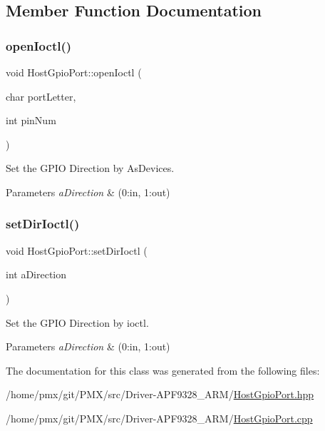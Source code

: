 \subsection{Member Function Documentation}
\mbox{\label{classHostGpioPort_a470f2d24f0f75d05fdc769db97af7a5b}} 
\subsubsection{\texorpdfstring{open\+Ioctl()}{openIoctl()}}
{\footnotesize\ttfamily void Host\+Gpio\+Port\+::open\+Ioctl (\begin{DoxyParamCaption}\item[{char}]{port\+Letter,  }\item[{int}]{pin\+Num }\end{DoxyParamCaption})}



Set the G\+P\+IO Direction by As\+Devices. 


\begin{DoxyParams}{Parameters}
{\em a\+Direction} & (0\+:in, 1\+:out) \\
\hline
\end{DoxyParams}
\mbox{\label{classHostGpioPort_a0c7cf6d4131e5aa2bfa88c85c169f856}} 
\subsubsection{\texorpdfstring{set\+Dir\+Ioctl()}{setDirIoctl()}}
{\footnotesize\ttfamily void Host\+Gpio\+Port\+::set\+Dir\+Ioctl (\begin{DoxyParamCaption}\item[{int}]{a\+Direction }\end{DoxyParamCaption})}



Set the G\+P\+IO Direction by ioctl. 


\begin{DoxyParams}{Parameters}
{\em a\+Direction} & (0\+:in, 1\+:out) \\
\hline
\end{DoxyParams}


The documentation for this class was generated from the following files\+:\begin{DoxyCompactItemize}
\item 
/home/pmx/git/\+P\+M\+X/src/\+Driver-\/\+A\+P\+F9328\+\_\+\+A\+R\+M/\hyperlink{HostGpioPort_8hpp}{Host\+Gpio\+Port.\+hpp}\item 
/home/pmx/git/\+P\+M\+X/src/\+Driver-\/\+A\+P\+F9328\+\_\+\+A\+R\+M/\hyperlink{HostGpioPort_8cpp}{Host\+Gpio\+Port.\+cpp}\end{DoxyCompactItemize}
